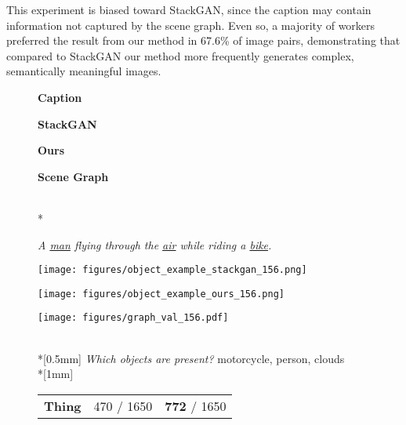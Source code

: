 \documentclass[10pt,twocolumn,letterpaper]{article}
\begin{document}
This experiment is biased toward StackGAN, since the caption may contain
information not captured by the scene graph. Even so, a majority of workers
preferred the result from our method in 67.6\% of image pairs,
demonstrating that compared to StackGAN our method more
frequently generates complex, semantically meaningful images.

\begin{figure}
  \centering
  \begin{minipage}{0.09\textwidth}
    \centering
    \textbf{Caption}
  \end{minipage}
  \begin{minipage}{0.11\textwidth}
    \centering
    \textbf{StackGAN~\cite{zhang2017stackgan}}
  \end{minipage}
  \begin{minipage}{0.11\textwidth}
    \centering
    \textbf{Ours}
  \end{minipage}
  \begin{minipage}{0.115\textwidth}
    \centering
    \textbf{Scene Graph}
  \end{minipage} \\*
  \begin{minipage}[b]{0.09\textwidth}
    \centering
    \footnotesize
    \textit{A \underline{man} flying through the \underline{air} while riding a \underline{bike}.}
    \vspace{2mm}
  \end{minipage}
  \begin{minipage}[b]{0.11\textwidth}
    \texttt{[image: figures/object\_example\_stackgan\_156.png]}
  \end{minipage}
  \begin{minipage}[b]{0.11\textwidth}
    \texttt{[image: figures/object\_example\_ours\_156.png]}
  \end{minipage}
  \begin{minipage}[b]{0.115\textwidth}
    \centering
    \texttt{[image: figures/graph\_val\_156.pdf]}
  \end{minipage} \\*[0.5mm]
  {\footnotesize
    \hspace{-16mm}\textit{Which objects are present?} motorcycle, person, clouds \\*[1mm]}
  \hspace*{-17mm}\begin{tabular}{c|cc}
    \hline
    \textbf{Thing}   & \hspace{1mm} 470 / 1650 \hspace{1mm} & \hspace{1mm} \textbf{772} / 1650 \hspace{1mm} \\

\end{tabular}
\end{figure}
\end{document}
